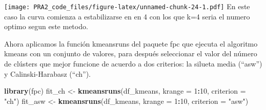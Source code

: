 \documentclass[
]{article}
\newenvironment{Shaded}{\begin{snugshade}}{\end{snugshade}}
\newcommand{\ControlFlowTok}[1]{\textcolor[rgb]{0.13,0.29,0.53}{\textbf{#1}}}
\newcommand{\DataTypeTok}[1]{\textcolor[rgb]{0.13,0.29,0.53}{#1}}
\newcommand{\DecValTok}[1]{\textcolor[rgb]{0.00,0.00,0.81}{#1}}
\newcommand{\KeywordTok}[1]{\textcolor[rgb]{0.13,0.29,0.53}{\textbf{#1}}}
\newcommand{\NormalTok}[1]{#1}
\newcommand{\OperatorTok}[1]{\textcolor[rgb]{0.81,0.36,0.00}{\textbf{#1}}}
\newcommand{\StringTok}[1]{\textcolor[rgb]{0.31,0.60,0.02}{#1}}
\begin{document}
\begin{Shaded}
\end{Shaded}

\texttt{[image: PRA2\_code\_files/figure-latex/unnamed-chunk-24-1.pdf]} En
este caso la curva comienza a estabilizarse en en 4 con los que k=4
seria el numero optimo segun este metodo.

Ahora aplicamos la función kmeansruns del paquete fpc que ejecuta el
algoritmo kmeans con un conjunto de valores, para después seleccionar el
valor del número de clústers que mejor funcione de acuerdo a dos
criterios: la silueta media (``asw'') y Calinski-Harabasz (``ch'').

\begin{Shaded}
\begin{Highlighting}[]
\KeywordTok{library}\NormalTok{(fpc)}
\NormalTok{fit_ch  <-}\StringTok{ }\KeywordTok{kmeansruns}\NormalTok{(df_kmeans, }\DataTypeTok{krange =} \DecValTok{1}\OperatorTok{:}\DecValTok{10}\NormalTok{, }\DataTypeTok{criterion =} \StringTok{"ch"}\NormalTok{) }
\NormalTok{fit_asw <-}\StringTok{ }\KeywordTok{kmeansruns}\NormalTok{(df_kmeans, }\DataTypeTok{krange =} \DecValTok{1}\OperatorTok{:}\DecValTok{10}\NormalTok{, }\DataTypeTok{criterion =} \StringTok{"asw"}\NormalTok{) }
\end{Highlighting}
\end{Shaded}
\end{document}
